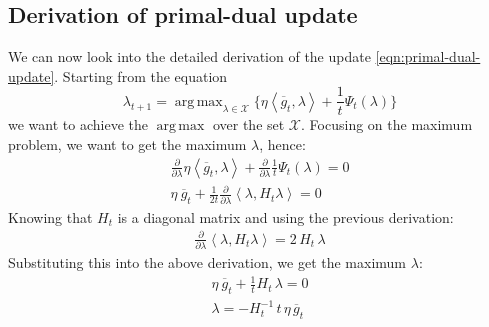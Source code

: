 \documentclass[notitlepage]{article}
\DeclareMathOperator*{\argmax}{arg\,max}
\begin{document}
\subsection{Derivation of primal-dual update}
We can now look into the detailed derivation of the update \eqref{eqn:primal-dual-update}. Starting from the equation
\[
  \lambda_{t+1} = \argmax_{\lambda \in \mathcal{X}} \{ \eta \left\langle \overline{g}_t,\lambda \right\rangle + \frac{1}{t} \Psi_t(\lambda) \} 
\]
we want to achieve the $\argmax$ over the set $\mathcal{X}$. Focusing on the maximum problem, we want to get the maximum $\lambda$, hence:
\begin{align*}
  \frac{\partial}{\partial \lambda} \eta \left\langle \overline{g}_t,\lambda \right\rangle + \frac{\partial}{\partial \lambda} \frac{1}{t} \Psi_t(\lambda) = 0 \\
  \eta\ \overline{g}_t + \frac{1}{2t} \frac{\partial}{\partial \lambda} \left\langle \lambda,H_t \lambda \right\rangle = 0 
\end{align*}  
Knowing that $H_t$ is a diagonal matrix and using the previous derivation:
\begin{align*}
  \frac{\partial}{\partial \lambda} \left\langle \lambda, H_t \lambda \right\rangle = 2\, H_t\, \lambda
\end{align*}
Substituting this into the above derivation, we get the maximum $\lambda$:
\begin{align*}
  \eta\ \overline{g}_t + \frac{1}{t} H_t\, \lambda = 0 \\
  \lambda = - H_t^{-1}\, t\, \eta\, \overline{g}_t
\end{align*}
\end{document}
